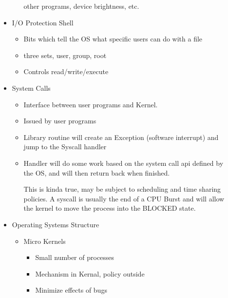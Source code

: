 \documentclass{report}
\begin{document}
\begin{description}
\begin{itemize}
\begin{itemize}
                        other programs, device brightness, etc.
                \end{itemize}
            \item I/O Protection Shell
                \begin{itemize}
                    \item Bits which tell the OS what specific users can do with a file
                    \item three sets, user, group, root
                    \item Controls read/write/execute
                \end{itemize}
            \item System Calls
                \begin{itemize}
                    \item Interface between user programs and Kernel.
                    \item Issued by user programs
                    \item Library routine will create an Exception (software interrupt)
                        and jump to the Syscall handler
                    \item Handler will do some work based on the system call api defined
                        by the OS, and will then return back when finished.
                        \begin{mdframed}
                            This is kinda true, may be subject to scheduling and time
                            sharing policies. A syscall is usually the end of a CPU Burst
                            and will allow the kernel to move the process into the BLOCKED
                            state.
                        \end{mdframed}
                \end{itemize}
            \item Operating Systems Structure
                \begin{itemize}
                    \item Micro Kernels
                        \begin{itemize}
                            \item Small number of processes
                            \item Mechanism in Kernal, policy outside
                            \item Minimize effects of bugs
                        \end{itemize}

\end{itemize}
\end{itemize}
\end{description}
\end{document}
